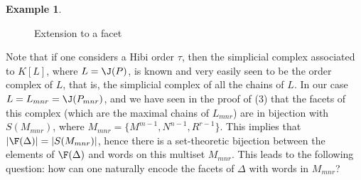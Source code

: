 \documentclass[12pt]{amsart}
\numberwithin{equation}{section}
\theoremstyle{definition}
\newtheorem{example}[theorem]{Example}
\begin{document}
\begin{example}
\begin{figure}[h]
      
      \caption{Extension to a facet}
      \label{fig: facet extension}
  \end{figure}
\end{example}


Note that if one considers a Hibi order $\tau$, then the simplicial complex associated to $K[L]$, where $L=\J(P)$, is known and very easily seen to be the order complex of $L$, that is, the simplicial complex of all the chains of $L$. In our case $L=L_{mnr}=\J(P_{mnr})$, and we have seen in the proof of (3) that the facets of this complex (which are the maximal chains of $L_{mnr}$) are in bijection with $S(M_{mnr})$, where $M_{mnr}=\{M^{m-1}, N^{n-1}, R^{r-1}\}$. This implies that $|\F(\Delta)|=|S(M_{mnr})|$, hence there is a set-theoretic bijection between the elements of $\F(\Delta)$ and words on this multiset $M_{mnr}$. This leads to the following question: how can one naturally encode the facets of $\Delta$ with words in $M_{mnr}$? 
\end{document}

